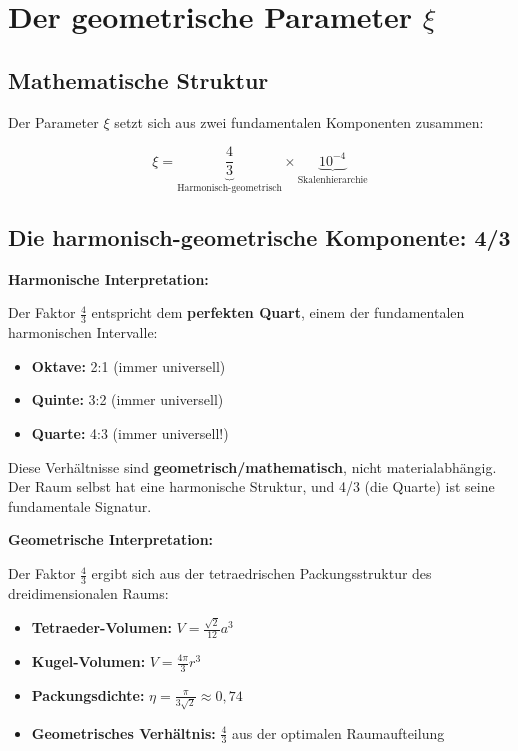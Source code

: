 	\section{Der geometrische Parameter $\xi$}
	
	\subsection{Mathematische Struktur}
	
	Der Parameter $\xi$ setzt sich aus zwei fundamentalen Komponenten zusammen:
	
	\begin{equation}
		\xi = \underbrace{\frac{4}{3}}_{\text{Harmonisch-geometrisch}} \times \underbrace{10^{-4}}_{\text{Skalenhierarchie}}
		\label{eq:xi_components}
	\end{equation}
	
	\subsection{Die harmonisch-geometrische Komponente: 4/3}
	
	\begin{alternative}
		\textbf{Harmonische Interpretation:}
		
		Der Faktor $\frac{4}{3}$ entspricht dem \textbf{perfekten Quart}, einem der fundamentalen harmonischen Intervalle:
		\begin{itemize}
			\item \textbf{Oktave:} 2:1 (immer universell)
			\item \textbf{Quinte:} 3:2 (immer universell)  
			\item \textbf{Quarte:} 4:3 (immer universell!)
		\end{itemize}
		
		Diese Verhältnisse sind \textbf{geometrisch/mathematisch}, nicht materialabhängig. Der Raum selbst hat eine harmonische Struktur, und 4/3 (die Quarte) ist seine fundamentale Signatur.
	\end{alternative}
	
	\begin{alternative}
		\textbf{Geometrische Interpretation:}
		
		Der Faktor $\frac{4}{3}$ ergibt sich aus der tetraedrischen Packungsstruktur des dreidimensionalen Raums:
		\begin{itemize}
			\item \textbf{Tetraeder-Volumen:} $V = \frac{\sqrt{2}}{12}a^3$
			\item \textbf{Kugel-Volumen:} $V = \frac{4\pi}{3}r^3$ 
			\item \textbf{Packungsdichte:} $\eta = \frac{\pi}{3\sqrt{2}} \approx 0{,}74$
			\item \textbf{Geometrisches Verhältnis:} $\frac{4}{3}$ aus der optimalen Raumaufteilung
		\end{itemize}
	\end{alternative}
	
